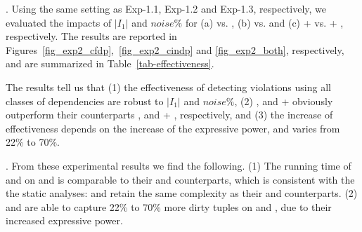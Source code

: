 . Using the same setting as {Exp-1.1}, {Exp-1.2} and {Exp-1.3}, respectively, we evaluated the impacts of $|I_1|$ and $noise\%$ for 
(a) {\pCFDs vs. \CFDs}, (b) {\pCINDs vs. \CINDs} and (c) {\pCFDs + \pCINDs vs. \CFDs + \CINDs}, respectively. 
%
The results are reported in Figures~\ref{fig_exp2_cfdp},~\ref{fig_exp2_cindp} and \ref{fig_exp2_both}, respectively, and are summarized in Table~\ref{tab-effectiveness}.

The results tell us that (1) the effectiveness of detecting violations using all classes of dependencies are robust to $|I_1|$ and $noise\%$,
%
(2) \pCFDs, \pCINDs and \pCFDs + \pCINDs obviously outperform their counterparts \CFDs, \CINDs and \CFDs + \CINDs, respectively, and 
%
(3) the increase of effectiveness depends on the increase of the expressive power, and varies from 22\% to 70\%.




. From these experimental results we find the following.
(1) The running time of \pCFDs and \pCINDs on  \hosp and \dblp is comparable to their \CFDs and \CINDs counterparts, which is consistent with the 
the static analyses:  \pCFDs and \pCINDs retain the same complexity
as their \CFDs and \CINDs counterparts.
(2) \pCFDs and \pCINDs are able to capture 22\% to 70\% more dirty tuples on \hosp and \dblp, due to their increased expressive power. 








\eat{%
\begin{figure}[tb!]
  \centering
  \centering
  \subfigure[Varying $|I_{1}|$ for \hosp]{\epsfig{file=exp-fig/21a.eps}}  %
  \quad
  \subfigure[Varying $noise\%$ for \hosp]{\epsfig{file=exp-fig/21b.eps}}
  \quad
  \subfigure[Varying $|I_{1}|$ for \dblp]{\epsfig{file=exp-fig/21c.eps}}
  \quad
  \subfigure[Varying $noise\%$ for \dblp]{\epsfig{file=exp-fig/21d.eps}}
  \caption{Effectiveness of detecting \pCFD violations}\label{fig_exp2_cfdp}
\end{figure}
}

\eat{\begin{figure}[tb!]
  \centering
  \centering
  \subfigure[Varying $|I_{1}|$ for \hosp]{\epsfig{file=exp-fig/22a.eps}}  %
  \quad
  \subfigure[Varying $noise\%$ for \hosp]{\epsfig{file=exp-fig/22b.eps}}
  \quad
  \subfigure[Varying $|I_{1}|$ for \dblp]{\epsfig{file=exp-fig/22c.eps}}
  \quad
  \subfigure[Varying $noise\%$ for \dblp]{\epsfig{file=exp-fig/22d.eps}}
  \caption{Effectiveness of detecting \pCIND violations}\label{fig_exp2_cindp}
\end{figure}
}

